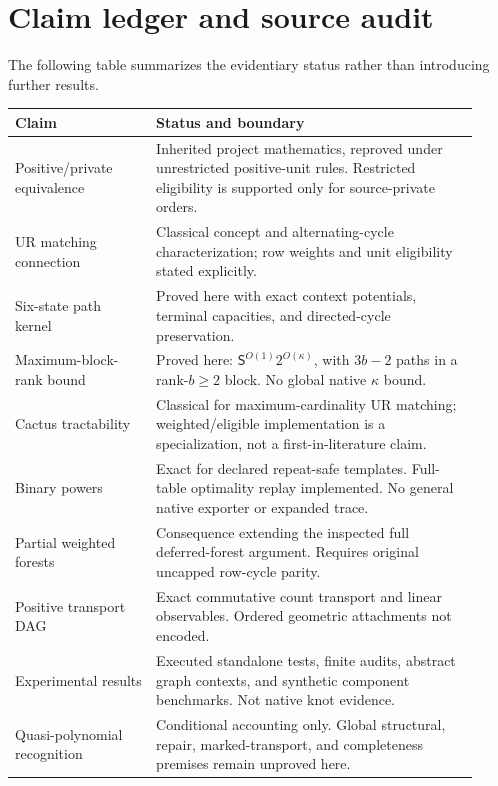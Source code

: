 \documentclass[11pt,letterpaper]{article}
\theoremstyle{definition}
\theoremstyle{remark}
\newcommand{\size}{\mathsf S}
\begin{document}
\section{Claim ledger and source audit}
The following table summarizes the evidentiary status rather than introducing further results.
\begin{longtable}{>{\raggedright\arraybackslash}p{0.28\linewidth}>{\raggedright\arraybackslash}p{0.64\linewidth}}
\toprule
Claim & Status and boundary \\
\midrule
\endhead
Positive/private equivalence & Inherited project mathematics, reproved under unrestricted positive-unit rules. Restricted eligibility is supported only for source-private orders. \\
UR matching connection & Classical concept and alternating-cycle characterization; row weights and unit eligibility stated explicitly. \\
Six-state path kernel & Proved here with exact context potentials, terminal capacities, and directed-cycle preservation. \\
Maximum-block-rank bound & Proved here: $\size^{O(1)}2^{O(\kappa)}$, with $3b-2$ paths in a rank-$b\ge2$ block. No global native $\kappa$ bound. \\
Cactus tractability & Classical for maximum-cardinality UR matching; weighted/eligible implementation is a specialization, not a first-in-literature claim. \\
Binary powers & Exact for declared repeat-safe templates. Full-table optimality replay implemented. No general native exporter or expanded trace. \\
Partial weighted forests & Consequence extending the inspected full deferred-forest argument. Requires original uncapped row-cycle parity. \\
Positive transport DAG & Exact commutative count transport and linear observables. Ordered geometric attachments not encoded. \\
Experimental results & Executed standalone tests, finite audits, abstract graph contexts, and synthetic component benchmarks. Not native knot evidence. \\
Quasi-polynomial recognition & Conditional accounting only. Global structural, repair, marked-transport, and completeness premises remain unproved here. \\
\bottomrule
\end{longtable}
\end{document}
